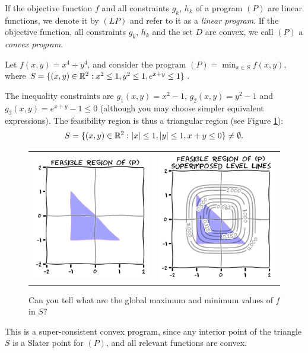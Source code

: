 If the objective function $f$ and all constraints $g_k$, $h_k$ of a program $(P)$ are linear functions, we denote it by $(LP)$ and refer to it as a \emph{linear program}.  If the objective function, all constraints $g_k$, $h_k$ and the set $D$ are convex, we call $(P)$ a \emph{convex program}.

\begin{example}\label{example:feasibleP1}
Let $f(x,y)=x^4+y^4$, and consider the program $(P) = \min_{x\in S} f(x,y)$, where $S = \{ (x,y) \in \mathbb{R}^2: x^2 \leq 1, y^2 \leq 1, e^{x+y}\leq 1\}$.

The inequality constraints are $g_1(x,y)=x^2-1$, $g_2(x,y)=y^2-1$ and $g_3(x,y)=e^{x+y}-1\leq 0$ (although you may choose simpler equivalent expressions).  The feasibility region is thus a triangular region (see Figure \ref{figure:feasibleP1}):
\begin{equation*}
S = \{ (x,y) \in \mathbb{R}^2 : \lvert x \rvert \leq 1, \lvert y \rvert \leq 1, x+y \leq 0 \} \neq \emptyset.
\end{equation*}
\begin{figure}[ht!]
\begin{tabular}{cc}
\includegraphics[width=0.5\linewidth]{images/feasibleP1.png} &
\includegraphics[width=0.5\linewidth]{images/feasibleP2.png} 
\end{tabular}
\caption{Can you tell what are the global maximum and minimum values of $f$ in $S$?}
\label{figure:feasibleP1}
\end{figure}
This is a super-consistent convex program, since any interior point of the triangle $S$ is a Slater point for $(P)$, and all relevant functions are convex.
\end{example}

